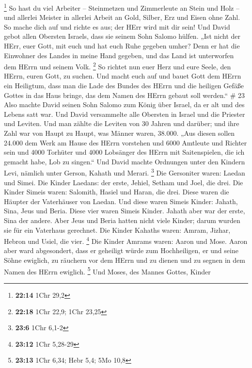 \footnote{\textbf{22:14} 1Chr 29,2}  So hast du viel
Arbeiter -- Steinmetzen und Zimmerleute an Stein und Holz -- und
allerlei Meister in allerlei Arbeit  an Gold, Silber, Erz
und Eisen ohne Zahl. So mache dich auf und richte es aus; der HErr wird
mit dir sein!  Und David gebot allen Obersten Israels, dass
sie seinem Sohn Salomo hülfen.  „Ist nicht der HErr, euer
Gott, mit euch und hat euch Ruhe gegeben umher? Denn er hat die
Einwohner des Landes in meine Hand gegeben, und das Land ist unterworfen
dem HErrn und seinem Volk. \footnote{\textbf{22:18} 1Chr 22,9; 1Chr
  23,25}  So richtet nun euer Herz und eure Seele, den
HErrn, euren Gott, zu suchen. Und macht euch auf und bauet Gott dem
HErrn ein Heiligtum, dass man die Lade des Bundes des HErrn und die
heiligen Gefäße Gottes in das Haus bringe, das dem Namen des HErrn
gebaut soll werden.`` \# 23  Also machte David seinen Sohn
Salomo zum König über Israel, da er alt und des Lebens satt war.
 Und David versammelte alle Obersten in Israel und die
Priester und Leviten.  Und man zählte die Leviten von 30
Jahren und darüber; und ihre Zahl war von Haupt zu Haupt, was Männer
waren, 38.000.  „Aus diesen sollen 24.000 dem Werk am Hause
des HErrn vorstehen und 6000 Amtleute und Richter sein  und
4000 Torhüter und 4000 Lobsänger des HErrn mit Saitenspielen, die ich
gemacht habe, Lob zu singen.``  Und David machte Ordnungen
unter den Kindern Levi, nämlich unter Gerson, Kahath und Merari.
\footnote{\textbf{23:6} 1Chr 6,1-2}  Die Gersoniter waren:
Laedan und Simei.  Die Kinder Laedans: der erste, Jehiel,
Setham und Joel, die drei.  Die Kinder Simeis waren:
Salomith, Hasiel und Haran, die drei. Diese waren die Häupter der
Vaterhäuser von Laedan.  Und diese waren Simeis Kinder:
Jahath, Sina, Jeus und Beria. Diese vier waren Simeis Kinder.
 Jahath aber war der erste, Sina der andere. Aber Jeus und
Beria hatten nicht viele Kinder; darum wurden sie für ein Vaterhaus
gerechnet.  Die Kinder Kahaths waren: Amram, Jizhar, Hebron
und Usiel, die vier. \footnote{\textbf{23:12} 1Chr 5,28-29}
 Die Kinder Amrams waren: Aaron und Mose. Aaron aber ward
abgesondert, dass er geheiligt würde zum Hochheiligen, er und seine
Söhne ewiglich, zu räuchern vor dem HErrn und zu dienen und zu segnen in
dem Namen des HErrn ewiglich. \footnote{\textbf{23:13} 1Chr 6,34; Hebr
  5,4; 5Mo 10,8}  Und Moses, des Mannes Gottes, Kinder
